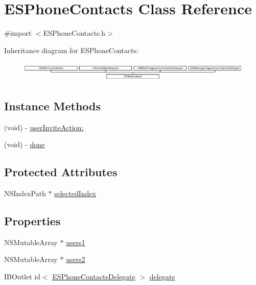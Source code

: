 \hypertarget{interface_e_s_phone_contacts}{}\section{E\+S\+Phone\+Contacts Class Reference}
\label{interface_e_s_phone_contacts}


{\ttfamily \#import $<$E\+S\+Phone\+Contacts.\+h$>$}

Inheritance diagram for E\+S\+Phone\+Contacts\+:\begin{figure}[H]
\begin{center}
\leavevmode
\includegraphics[height=0.965517cm]{interface_e_s_phone_contacts}
\end{center}
\end{figure}
\subsection*{Instance Methods}
\begin{DoxyCompactItemize}
\item 
(void) -\/ \hyperlink{interface_e_s_phone_contacts_ad6757e8f899a4399c22f2b509c328b2e}{user\+Invite\+Action\+:}
\item 
(void) -\/ \hyperlink{interface_e_s_phone_contacts_a83b16471d5d9e9a192f1611d56b1751f}{done}
\end{DoxyCompactItemize}
\subsection*{Protected Attributes}
\begin{DoxyCompactItemize}
\item 
N\+S\+Index\+Path $\ast$ \hyperlink{interface_e_s_phone_contacts_a94b55ed8d3ab31d45bd39cb4ad120e08}{selected\+Index}
\end{DoxyCompactItemize}
\subsection*{Properties}
\begin{DoxyCompactItemize}
\item 
N\+S\+Mutable\+Array $\ast$ \hyperlink{interface_e_s_phone_contacts_a57e8b65c0453b3846f101a0483f25a11}{users1}
\item 
N\+S\+Mutable\+Array $\ast$ \hyperlink{interface_e_s_phone_contacts_aaf714ab9942fdca5066c2fc1682be314}{users2}
\item 
I\+B\+Outlet id$<$ \hyperlink{protocol_e_s_phone_contacts_delegate-p}{E\+S\+Phone\+Contacts\+Delegate} $>$ \hyperlink{interface_e_s_phone_contacts_a8794cdc4441eb885facd7a4f01e23ad3}{delegate}
\end{DoxyCompactItemize}


